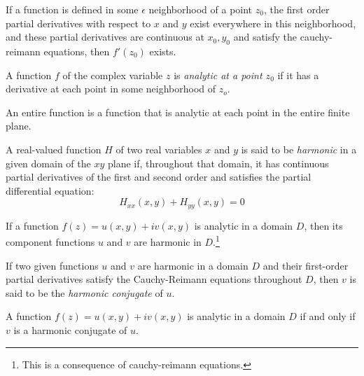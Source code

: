 \documentclass[nobib,notoc]{tufte-handout}
\begin{document}
\begin{thm}
	If a function is defined in some \(\epsilon\) neighborhood of a point \(z_0\), the first order partial derivatives with respect to \(x\) and \(y\) exist everywhere in this neighborhood, and these partial derivatives are continuous at \(x_0, y_0\) and satisfy the cauchy-reimann equations, then \(f'(z_0)\) exists.
\end{thm}
\begin{defi}
	A function \(f\) of the complex variable \(z\) is \emph{analytic at a point \(z_0\)} if it has a derivative at each point in some neighborhood of \(z_o\).
\end{defi}
\begin{defi}
	An entire function is a function that is analytic at each point in the entire finite plane.
\end{defi}
\begin{defi}
	A real-valued function \(H\) of two real variables \(x\) and \(y\) is said to be \emph{harmonic} in a given domain of the \(xy\) plane if, throughout that domain, it has continuous partial derivatives of the first and second order and satisfies the partial differential equation:
\begin{equation*}
	H_{xx}(x,y)+H_{yy}(x,y)=0
\end{equation*}
\end{defi}
\begin{thm}
	If a function \(f(z)=u(x,y)+iv(x,y)\) is analytic in a domain \(D\), then its component functions \(u\) and \(v\) are harmonic in \(D\).\footnote{This is a consequence of cauchy-reimann equations.}
\end{thm}
\begin{defi}
	If two given functions \(u\) and \(v\) are harmonic in a domain \(D\) and their first-order partial derivatives satisfy the Cauchy-Reimann equations throughout \(D\), then \(v\) is said to be the \emph{harmonic conjugate} of \(u\).
\end{defi}
\begin{thm}
	A function \(f(z)=u(x,y)+iv(x,y)\) is analytic in a domain \(D\) if and only if \(v\) is a harmonic conjugate of \(u\).
\end{thm}
\end{document}
